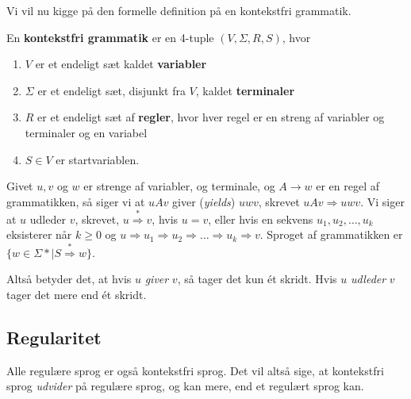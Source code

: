 Vi vil nu kigge på den formelle definition på en kontekstfri grammatik.

\begin{definition}
	En \textbf{kontekstfri grammatik}   er en 4-tuple $(V, \Sigma, R, S)$, hvor
	\begin{enumerate}
		\item $V$ er et endeligt sæt kaldet \textbf{variabler}
		\item $\Sigma$ er et endeligt sæt, disjunkt fra $V$, kaldet \textbf{terminaler}
		\item $R$ er et endeligt sæt af \textbf{regler}, hvor hver regel er en streng af variabler og terminaler og en variabel
		\item $S \in V$ er startvariablen.
	\end{enumerate}

\end{definition}

Givet $u, v$ og $w$ er strenge af variabler, og terminale, og $A \rightarrow w$ er en regel af grammatikken, så siger vi at $uAv$ giver (\textit{yields}) $uwv$, skrevet $uAv \Rightarrow uwv$. Vi siger at $u$ udleder $v$, skrevet, $u \stackrel{*}{\Rightarrow} v$, hvis $u = v$, eller hvis en sekvens $u_{1}, u_{2}, \ldots, u_{k}$ eksisterer når $k \geq 0$ og $u \Rightarrow u_{1} \Rightarrow u_{2} \Rightarrow \ldots \Rightarrow u_{k} \Rightarrow v$. Sproget af grammatikken er $\{w \in \Sigma* | S \stackrel{*}{\Rightarrow} w\}$.

Altså betyder det, at hvis $u$ \textit{giver} $v$, så tager det kun ét skridt. Hvis $u$ \textit{udleder} $v$ tager det mere end ét skridt.


\newpage

\subsection{Regularitet}%
\label{subsec:cflregularity}

Alle regulære sprog er også kontekstfri sprog. Det vil altså sige, at kontekstfri sprog \textit{udvider} på regulære sprog, og kan mere, end et regulært sprog kan.

